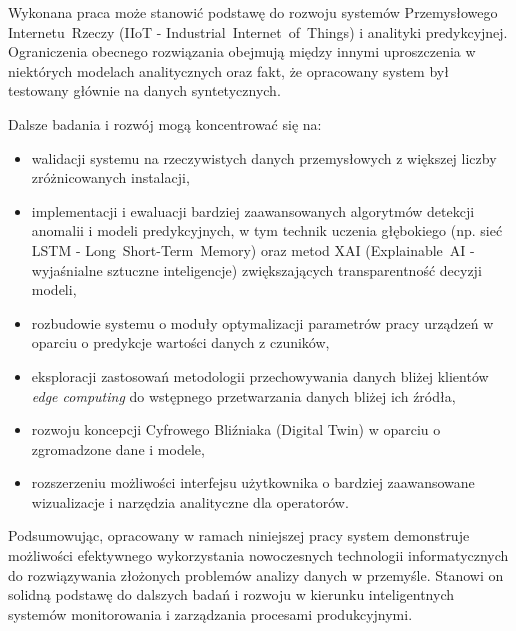 \vspace{0.3em}

Wykonana praca może stanowić podstawę do rozwoju systemów Przemysłowego \mbox{Internetu Rzeczy} (\mbox{IIoT} - \mbox{Industrial Internet of Things}) i analityki predykcyjnej. Ograniczenia obecnego rozwiązania obejmują między innymi uproszczenia w niektórych modelach analitycznych oraz fakt, że opracowany system był testowany głównie na danych syntetycznych. 

\vspace{0.3em}

Dalsze badania i rozwój mogą koncentrować się na:
\begin{itemize}
    \item walidacji systemu na rzeczywistych danych przemysłowych z większej liczby zróżnicowanych instalacji,
    \item implementacji i ewaluacji bardziej zaawansowanych algorytmów detekcji anomalii i modeli predykcyjnych, w tym technik uczenia głębokiego (np. sieć LSTM - \mbox{Long Short-Term Memory}) oraz metod \mbox{XAI} (\mbox{Explainable AI} - wyjaśnialne sztuczne inteligencje) zwiększających transparentność decyzji modeli,
    \item rozbudowie systemu o moduły optymalizacji parametrów pracy urządzeń w oparciu o predykcje wartości danych z czuników,
    \item eksploracji zastosowań metodologii przechowywania danych bliżej klientów \textit{edge computing} do wstępnego przetwarzania danych bliżej ich źródła,
    \item rozwoju koncepcji Cyfrowego Bliźniaka (Digital Twin) w oparciu o zgromadzone dane i modele,
    \item rozszerzeniu możliwości interfejsu użytkownika o bardziej zaawansowane wizualizacje i narzędzia analityczne dla operatorów.
\end{itemize}

\vspace{0.3em}

Podsumowując, opracowany w ramach niniejszej pracy system demonstruje możliwości efektywnego wykorzystania nowoczesnych technologii informatycznych do rozwiązywania złożonych problemów analizy danych w przemyśle. Stanowi on solidną podstawę do dalszych badań i rozwoju w kierunku inteligentnych systemów monitorowania i zarządzania procesami produkcyjnymi. 